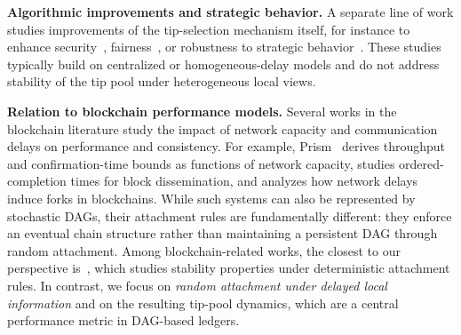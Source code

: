 \documentclass[a4paper,12pt,oneside,reqno]{amsart}
\newcommand{\1}{{\mathbf 1}}
\begin{document}
\medskip
\textbf{Algorithmic improvements and strategic behavior.}
A separate line of work studies improvements of the tip-selection mechanism itself, for instance to enhance security~\cite{attias2019choose,bramas2021efficient}, fairness~\cite{bu2019g}, or robustness to strategic behavior~\cite{popov2019equilibria}. These studies typically build on centralized or homogeneous-delay models and do not address stability of the tip pool under heterogeneous local views.

\medskip
\textbf{Relation to blockchain performance models.}
Several works in the blockchain literature study the impact of network capacity and communication delays on performance and consistency. For example, Prism~\cite{bagaria2019prism} derives throughput and confirmation-time bounds as functions of network capacity, \cite{hegde2022performance} studies ordered-completion times for block dissemination, and \cite{decker2013information} analyzes how network delays induce forks in blockchains. While such systems can also be represented by stochastic DAGs, their attachment rules are fundamentally different: they enforce an eventual chain structure rather than maintaining a persistent DAG through random attachment. Among blockchain-related works, the closest to our perspective is~\cite{gopalan2020stability}, which studies stability properties under deterministic attachment rules. In contrast, we focus on \emph{random attachment under delayed local information} and on the resulting tip-pool dynamics, which are a central performance metric in DAG-based ledgers.
\end{document}
